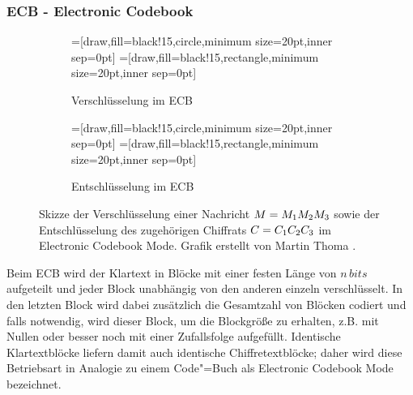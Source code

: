 \subsubsection{ECB - Electronic Codebook}
\begin{figure}[h]
	\centering
	\begin{subfigure}[h]{.45\textwidth}
		\centering
		=[draw,fill=black!15,circle,minimum size=20pt,inner sep=0pt]
		=[draw,fill=black!15,rectangle,minimum size=20pt,inner sep=0pt]
		\caption{Verschlüsselung im ECB}
	\end{subfigure}
	\hfill
	\begin{subfigure}[h]{.45\textwidth}
		\centering
		=[draw,fill=black!15,circle,minimum size=20pt,inner sep=0pt]
		=[draw,fill=black!15,rectangle,minimum size=20pt,inner sep=0pt]
		\caption{Entschlüsselung im ECB}
	\end{subfigure}
	\caption{Skizze der Verschlüsselung einer Nachricht $M = M_1 M_2 M_3$ sowie der Entschlüsselung des zugehörigen Chiffrats $C = C_1 C_2 C_3$ im
	Electronic Codebook Mode. Grafik erstellt von Martin Thoma \cite{martinthoma}.}
\end{figure}

Beim ECB wird der Klartext in Blöcke mit einer festen Länge von $n\,bits$ aufgeteilt und jeder Block unabhängig von den anderen einzeln verschlüsselt. In den
letzten Block wird dabei zusätzlich die Gesamtzahl von Blöcken codiert und falls notwendig, wird dieser Block, um die Blockgröße zu erhalten, z.B. mit Nullen
oder besser noch mit einer Zufallsfolge aufgefüllt. Identische Klartextblöcke liefern damit auch identische Chiffretextblöcke; daher wird diese Betriebsart in
Analogie zu einem Code"=Buch als Electronic Codebook Mode bezeichnet.

